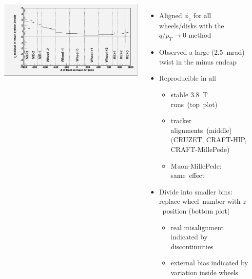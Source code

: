 \documentclass[compress]{beamer}
\begin{document}
\begin{frame}
\begin{columns}
\includegraphics[width=\linewidth]{phiresid_from_muon.png}


\begin{itemize}
\item Aligned $\phi_z$ for all wheels/disks with
  the $q/p_T \to 0$ method

\item Observed a large (2.5~mrad) twist in the minus endcap 

\item Reproducible in all

\vspace{-0.25 cm}
\begin{itemize}
\item stable 3.8~T \mbox{runs (top plot)\hspace{-1 cm}}

\item tracker \mbox{alignments (middle)\hspace{-0.5 cm}} {\scriptsize (CRUZET, CRAFT-HIP, CRAFT-MillePede)}

\item Muon-MillePede: \mbox{same effect\hspace{-1 cm}}
\end{itemize}

\item Divide into smaller bins: \mbox{replace\hspace{-0.5 cm}} wheel~number with $z$~position (bottom plot)

\vspace{-0.25 cm}
\begin{itemize}
\item real misalignment \mbox{indicated\hspace{-0.5 cm}} by discontinuities
\item external bias indicated by variation inside wheels
\end{itemize}

\end{itemize}
\end{columns}
\end{frame}
\end{document}
